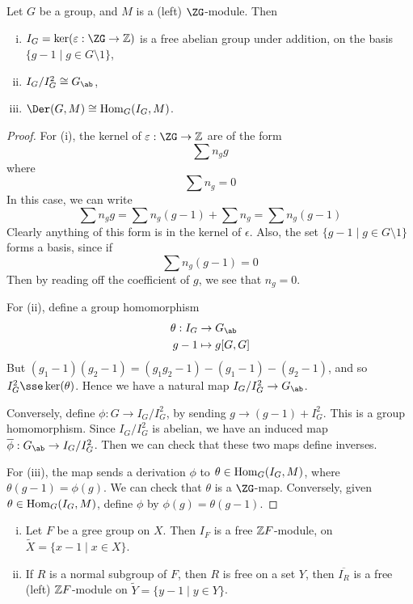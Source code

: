 \documentclass{article}
\begin{document}
\begin{lemma}
    \label{lem:ideal-props}
    Let \(G\) be a group, and \(M\) is a (left) \(\ZG\)-module. Then
    \begin{enumerate}[(i)]
        \item \(I_G = \ker(\epsilon : \ZG \to \Z)\) is a free abelian group under addition, on the basis \(\{g - 1 \mid g \in G \setminus 1\}\),
        \item \(I_G / I_G^2 \cong G_\ab\),
        \item \(\Der(G, M) \cong \Hom_G(I_G, M)\).
    \end{enumerate}
\end{lemma}

\begin{proof}
    For (i), the kernel of \(\epsilon : \ZG \to \Z\) are of the form
    \[\sum n_g g\]
    where
    \[\sum n_g = 0\]
    In this case, we can write
    \[\sum n_g g = \sum n_g (g - 1) + \sum n_g = \sum n_g (g - 1)\]
    Clearly anything of this form is in the kernel of \(\epsilon\). Also, the set \(\{g - 1 \mid g \in G \setminus 1\}\) forms a basis, since if
    \[\sum n_g (g - 1) = 0\]
    Then by reading off the coefficient of \(g\), we see that \(n_g = 0\).

    For (ii), define a group homomorphism
    \begin{align*}
        \theta : I_G &\to G_\ab \\
        g - 1 &\mapsto g[G, G]
    \end{align*}
    But \((g_1 - 1)(g_2 - 1) = (g_1g_2 - 1) - (g_1 - 1) - (g_2 - 1)\), and so \(I_G^2 \sse \ker(\theta)\). Hence we have a natural map \(I_G/I_G^2 \to G_\ab\).

    Conversely, define \(\phi : G \to I_G/I_G^2\), by sending \(g \to (g - 1) + I_G^2\). This is a group homomorphism. Since \(I_G/I_G^2\) is abelian, we have an induced map \(\overline\phi : G_\ab \to I_G/I_G^2\). Then we can check that these two maps define inverses.

    For (iii), the map sends a derivation \(\phi\) to \(\theta \in \operatorname{Hom}_G(I_G, M)\), where \(\theta(g-1) = \phi(g)\). We can check that \(\theta\) is a \(\ZG\)-map. Conversely, given \(\theta \in \operatorname{Hom}_G(I_G, M)\), define \(\phi\) by \(\phi(g) = \theta(g - 1)\).
\end{proof}

\begin{lemma}
    \begin{enumerate}[(i)]
        \item Let \(F\) be a gree group on \(X\). Then \(I_F\) is a free \(\mathbb{Z} F\)-module, on \(\widetilde X = \{x - 1 \mid x \in X\}\).
        \item If \(R\) is a normal subgroup of \(F\), then \(R\) is free on a set \(Y\), then \(\overline{I_R}\) is a free (left) \(\mathbb{Z} F\)-module on \(\widetilde Y = \{y - 1 \mid y \in Y\}\).
    \end{enumerate}
\end{lemma}
\end{document}
